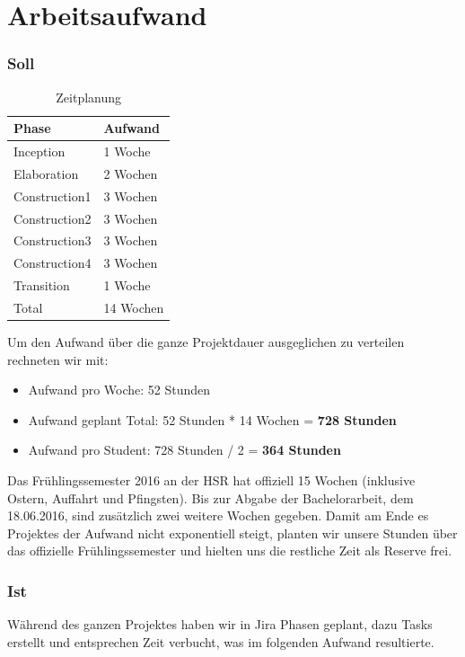 \section{Arbeitsaufwand}
\subsubsection{Soll}

\begin{table}[H]
	\centering
    \begin{tabular}{|p{6cm}|p{6cm}|}
    \hline    
    \rowcolor{lightblue}
	Phase & Aufwand \\ \hline   
	Inception & 1 Woche \\ \hline
	Elaboration & 2 Wochen \\ \hline
	Construction1 & 3 Wochen \\ \hline
	Construction2 & 3 Wochen \\ \hline
	Construction3 & 3 Wochen \\ \hline
	Construction4 & 3 Wochen \\ \hline
	Transition & 1 Woche \\ \hline
	\rowcolor{lightblue}
	Total & 14 Wochen \\ \hline
    \end{tabular}
    \caption[Zeitplanung]{Zeitplanung}
\end{table}
\medskip
Um den Aufwand über die ganze Projektdauer ausgeglichen zu verteilen rechneten wir mit:
\begin{itemize}
    \item Aufwand pro Woche: 52 Stunden
    \item Aufwand geplant Total: 52 Stunden * 14 Wochen = \textbf{728 Stunden}
    \item Aufwand pro Student: 728 Stunden / 2 = \textbf{364 Stunden}
\end{itemize}

Das Frühlingssemester 2016 an der HSR hat offiziell 15 Wochen  (inklusive Ostern, Auffahrt und Pfingsten). Bis zur Abgabe der Bachelorarbeit, dem 18.06.2016, sind zusätzlich zwei weitere Wochen gegeben. Damit am Ende es Projektes der Aufwand nicht exponentiell steigt, planten wir unsere Stunden über das offizielle Frühlingssemester und hielten uns die restliche Zeit als Reserve frei.
\newpage
\subsubsection{Ist}
Während des ganzen Projektes haben wir in Jira Phasen geplant, dazu Tasks erstellt und entsprechen Zeit verbucht, was im folgenden Aufwand resultierte.

